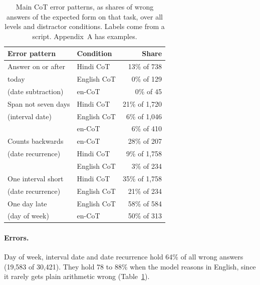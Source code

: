 \documentclass[11pt]{article}
\begin{document}
\begin{table}[t]
\centering
\setlength{\tabcolsep}{3pt}
\begin{tabularx}{\columnwidth}{@{}>{\raggedright\arraybackslash}X l r@{}}
\toprule
Error pattern & Condition & Share \\
\midrule
Answer on or after & Hindi CoT & 13\% of 738 \\
today & English CoT & 0\% of 129 \\
(date subtraction) & en-CoT & 0\% of 45 \\
\addlinespace
Span not seven days & Hindi CoT & 21\% of 1,720 \\
(interval date) & English CoT & 6\% of 1,046 \\
& en-CoT & 6\% of 410 \\
\addlinespace
Counts backwards & en-CoT & 28\% of 207 \\
(date recurrence) & Hindi CoT & 9\% of 1,758 \\
& English CoT & 3\% of 234 \\
\addlinespace
One interval short & Hindi CoT & 35\% of 1,758 \\
(date recurrence) & English CoT & 21\% of 234 \\
\addlinespace
One day late & English CoT & 58\% of 584 \\
(day of week) & en-CoT & 50\% of 313 \\
\bottomrule
\end{tabularx}
\caption{Main CoT error patterns, as shares of wrong answers of the expected form on that task, over all levels and distractor conditions. Labels come from a script. Appendix~A has examples.}
\label{tab:errors}
\end{table}

\paragraph{Errors.}
Day of week, interval date and date recurrence hold 64\% of all wrong answers (19,583 of 30,421). They hold 78 to 88\% when the model reasons in English, since it rarely gets plain arithmetic wrong (Table~\ref{tab:errors}).
\end{document}
